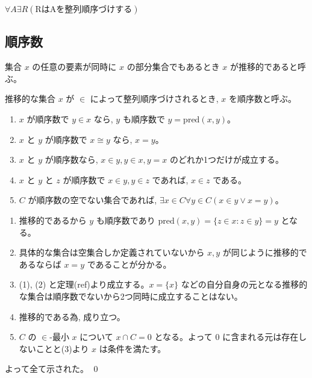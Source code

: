 \documentclass[uplatex,dvipdfmx,a4paper,11pt]{jlreq}
\makeatletter
\theoremstyle{definition}
\renewenvironment{proof}[1][\proofname]{\par
  \normalfont
  \topsep6\p@\@plus6\p@ \trivlist
  \item[\hskip\labelsep{\bfseries #1}\@addpunct{\bfseries}]\ignorespaces\quad\par
}{%
  \qed\endtrivlist\@endpefalse
}
\renewcommand\proofname{証明}
\makeatother
\begin{document}
\begin{axiom}[選択公理]
  $\forall A\exists R(\text{RはAを整列順序づけする})$
\end{axiom}


\subsection{順序数}
\begin{definition}[推移的]
  集合 $x$ の任意の要素が同時に $x$ の部分集合でもあるとき $x$ が推移的であると呼ぶ。
\end{definition}
\begin{definition}[順序数]
  推移的な集合 $x$ が $\in$ によって整列順序づけされるとき, $x$ を順序数と呼ぶ。
\end{definition}

\begin{theorem}
  \begin{enumerate}
    \item $x$ が順序数で $y\in x$ なら, $y$ も順序数で $y=\mathrm{pred}(x,y)$。
    \item $x$ と $y$ が順序数で $x\cong y$ なら, $x=y$。
    \item $x$ と $y$ が順序数なら, $x\in y, y\in x, y=x$ のどれか1つだけが成立する。
    \item $x$ と $y$ と $z$ が順序数で $x\in y, y\in z$ であれば, $x\in z$ である。
    \item $C$ が順序数の空でない集合であれば, $\exists x\in C\forall y\in C(x\in y\lor x=y)$。
  \end{enumerate}
\end{theorem}
\begin{proof}
  \begin{enumerate}
    \item 推移的であるから $y$ も順序数であり $\mathrm{pred}(x,y) = \{z\in x:z \in y\} = y$ となる。
    \item 具体的な集合は空集合しか定義されていないから $x, y$ が同じように推移的であるならば $x = y$ であることが分かる。
    \item (1), (2) と定理(ref)より成立する。$x=\{x\}$ などの自分自身の元となる推移的な集合は順序数でないから2つ同時に成立することはない。
    \item 推移的である為, 成り立つ。
    \item $C$ の $\in$-最小 $x$ について $x\cap C = 0$ となる。よって $0$ に含まれる元は存在しないことと(3)より $x$ は条件を満たす。
  \end{enumerate}
  よって全て示された。
\end{proof}
\end{document}
